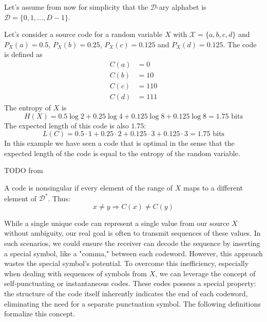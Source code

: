 \noindent Let's assume from now for simplicity that the $\mathcal{D}$-ary alphabet is $\mathcal{D} = \{0, 1, \ldots, D-1\}$.

\begin{example}\label{ex:source_code}
    Let's consider a source code for a random variable $X$ with $\mathcal{X} = \{a, b, c, d\}$ and $P_X(a) = 0.5$, $P_X(b) = 0.25$, $P_X(c) = 0.125$ and $P_X(d) = 0.125$. The code is defined as
    \begin{align*}
        C(a) & = 0   \\
        C(b) & = 10  \\
        C(c) & = 110 \\
        C(d) & = 111
    \end{align*}
    The entropy of $X$ is
    \begin{equation*}
        H(X) = 0.5\log 2 + 0.25\log 4 + 0.125\log 8 + 0.125\log 8 = 1.75 \text{ bits}
    \end{equation*}
    The expected length of this code is also $1.75$:
    \begin{equation*}
        L(C) = 0.5 \cdot 1 + 0.25 \cdot 2 + 0.125 \cdot 3 + 0.125 \cdot 3 = 1.75 \text{ bits}
    \end{equation*}
    In this example we have seen a code that is optimal in the sense that the expected length of the code is equal to the entropy of the random variable.
\end{example}

\begin{example}\label{ex:morse_code}
    TODO from \cite{ElementsofInformationTheory}
\end{example}

\begin{definition}\label{def:nonsingular_code}
    A code is nonsingular if every element of the range of $X$ maps to a different element of $\mathcal{D}^*$. Thus:
    \begin{equation}
        x \neq y \Rightarrow C(x) \neq C(y)
    \end{equation}
\end{definition}

\noindent While a single unique code can represent a single value from our source $X$ without ambiguity, our real goal is often to transmit sequences of these values. In such scenarios, we could ensure the receiver can decode the sequence by inserting a special symbol, like a "comma," between each codeword. However, this approach wastes the special symbol's potential. To overcome this inefficiency, especially when dealing with sequences of symbols from $X$, we can leverage the concept of self-punctuating or instantaneous codes. These codes possess a special property: the structure of the code itself inherently indicates the end of each codeword, eliminating the need for a separate punctuation symbol. The following definitions formalize this concept. \cite{ElementsofInformationTheory}

